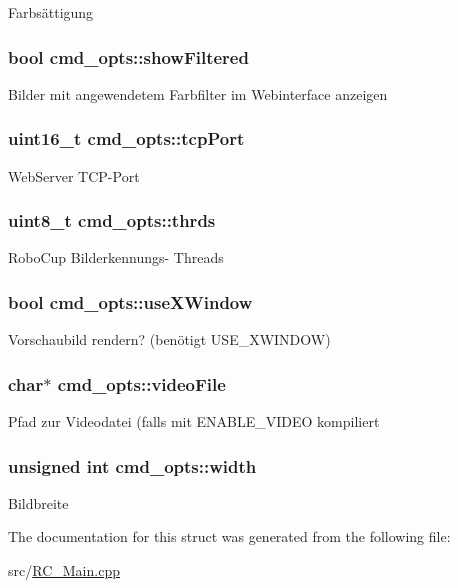 Farbsättigung \hypertarget{structcmd__opts_ab2a0a976837dc40909f765546c60c4c9}{
\subsubsection[{show\+Filtered}]{\setlength{\rightskip}{0pt plus 5cm}bool cmd\+\_\+opts\+::show\+Filtered}}\label{structcmd__opts_ab2a0a976837dc40909f765546c60c4c9}
Bilder mit angewendetem Farbfilter im Webinterface anzeigen \hypertarget{structcmd__opts_a2f37e990a3592777d92c156548422150}{
\subsubsection[{tcp\+Port}]{\setlength{\rightskip}{0pt plus 5cm}uint16\+\_\+t cmd\+\_\+opts\+::tcp\+Port}}\label{structcmd__opts_a2f37e990a3592777d92c156548422150}
Web\+Server T\+C\+P-\/\+Port \hypertarget{structcmd__opts_a7518cdbdbc6ed1b8cc404aa675f383a6}{
\subsubsection[{thrds}]{\setlength{\rightskip}{0pt plus 5cm}uint8\+\_\+t cmd\+\_\+opts\+::thrds}}\label{structcmd__opts_a7518cdbdbc6ed1b8cc404aa675f383a6}
Robo\+Cup Bilderkennungs-\/ Threads \hypertarget{structcmd__opts_aee44e8161de659e8fff50e09100f9ada}{
\subsubsection[{use\+X\+Window}]{\setlength{\rightskip}{0pt plus 5cm}bool cmd\+\_\+opts\+::use\+X\+Window}}\label{structcmd__opts_aee44e8161de659e8fff50e09100f9ada}
Vorschaubild rendern? (benötigt U\+S\+E\+\_\+\+X\+W\+I\+N\+D\+O\+W) \hypertarget{structcmd__opts_acee5a1c6793898bbda38d6d7fb5de431}{
\subsubsection[{video\+File}]{\setlength{\rightskip}{0pt plus 5cm}char$\ast$ cmd\+\_\+opts\+::video\+File}}\label{structcmd__opts_acee5a1c6793898bbda38d6d7fb5de431}
Pfad zur Videodatei (falls mit E\+N\+A\+B\+L\+E\+\_\+\+V\+I\+D\+E\+O kompiliert \hypertarget{structcmd__opts_a0f13b6290e7e33c22a258c11ed23f72f}{
\subsubsection[{width}]{\setlength{\rightskip}{0pt plus 5cm}unsigned int cmd\+\_\+opts\+::width}}\label{structcmd__opts_a0f13b6290e7e33c22a258c11ed23f72f}
Bildbreite 

The documentation for this struct was generated from the following file\+:\begin{DoxyCompactItemize}
\item 
src/\hyperlink{RC__Main_8cpp}{R\+C\+\_\+\+Main.\+cpp}\end{DoxyCompactItemize}
